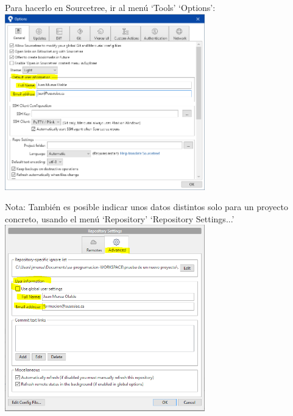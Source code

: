 \documentclass[spanish,12pt,a4paper,final,oneside]{book}
\begin{document}
Para hacerlo en Sourcetree, ir al menú `Tools' `Options':
\\ \includegraphics[width=0.65\textwidth]{Sourcetree - configurar datos identificativos generales}

Nota: También es posible indicar unos datos distintos solo para un proyecto concreto, usando el menú `Repository' `Repository Settings...'
\\ \includegraphics[width=0.65\textwidth]{Sourcetree - configurar datos identificativos para un repositorio}
\end{document}
